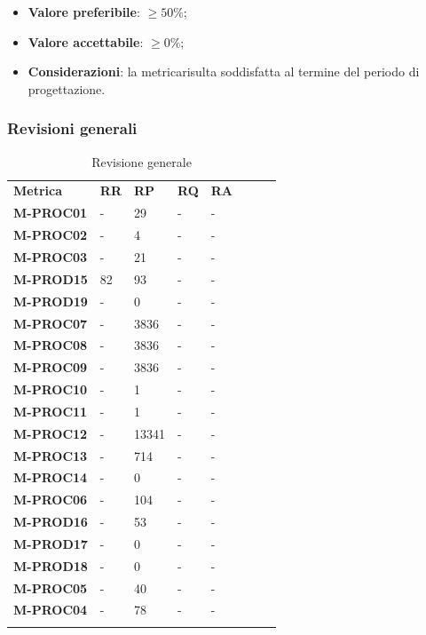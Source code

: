 \begin{itemize}
	\item \textbf{Valore preferibile}: $\ge50\%$;
	\item \textbf{Valore accettabile}: $\ge0\%$;
	\item \textbf{Considerazioni}: la metrica\glosp risulta soddisfatta al termine del periodo di progettazione\glo.
\end{itemize}

\subsubsection{Revisioni generali}\mbox{}
\begin{longtable} {						
		>{}p{50mm}  		
		>{}p{8mm}		
		>{}p{8mm}		
		>{}p{8mm}		
		>{}p{8mm}		
		>{}p{8mm}		
		>{}p{8mm}
		>{}p{8mm}				
	}			
	\rowcolor{gray!50}
	\textbf{Metrica} & \textbf{RR} & \textbf{RP} & \textbf{RQ} & \textbf{RA} \TBstrut \\ [2mm]
	\textbf{M-PROC01} & - & 29 & - & - \TBstrut \\ [2mm]
	\textbf{M-PROC02} & - & 4 & - & - \TBstrut \\ [2mm]
	\textbf{M-PROC03} & - & 21 & - & - \TBstrut \\ [2mm]
	\textbf{M-PROD15} & 82 & 93 & - & - \TBstrut \\ [2mm]
	\textbf{M-PROD19} & - & 0 & - & - \TBstrut \\ [2mm]
	\textbf{M-PROC07} & - & 3836 & - & - \TBstrut \\ [2mm]
	\textbf{M-PROC08} & - & 3836 & - & - \TBstrut \\ [2mm]
	\textbf{M-PROC09} & - & 3836 & - & - \TBstrut \\ [2mm]
	\textbf{M-PROC10} & - & 1 & - & - \TBstrut \\ [2mm]
	\textbf{M-PROC11} & - & 1 & - & - \TBstrut \\ [2mm]
	\textbf{M-PROC12} & - & 13341 & - & - \TBstrut \\ [2mm]
	\textbf{M-PROC13} & - & 714 & - & - \TBstrut \\ [2mm]
	\textbf{M-PROC14} & - & 0 & - & - \TBstrut \\ [2mm]
	\textbf{M-PROC06} & - & 104 & - & - \TBstrut \\ [2mm]
	\textbf{M-PROD16} & - & 53 & - & - \TBstrut \\ [2mm]
	\textbf{M-PROD17} & - & 0 & - & - \TBstrut \\ [2mm]
	\textbf{M-PROD18} & - & 0 & - & - \TBstrut \\ [2mm]
	\textbf{M-PROC05} & - & 40 & - & - \TBstrut \\ [2mm]
	\textbf{M-PROC04} & - & 78 & - & - \TBstrut \\ [2mm]
	\rowcolor{white}
	\caption{Revisione generale}
\end{longtable}





